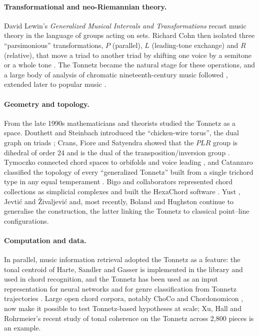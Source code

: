 \paragraph{Transformational and neo-Riemannian theory.} David Lewin's \emph{Generalized Musical Intervals and
Transformations} \citep{lewin1987} recast music theory in the language of groups acting on sets. Richard Cohn
then isolated three ``parsimonious'' transformations, $P$ (parallel), $L$ (leading-tone exchange) and $R$
(relative), that move a triad to another triad by shifting one voice by a semitone or a whole tone
\citep{cohn1996,cohn1997,cohn1998}. The Tonnetz became the natural stage for these operations, and a large body of
analysis of chromatic nineteenth-century music followed \citep{cohn2012}, extended later to popular music
\citep{capuzzo2004}.

\paragraph{Geometry and topology.} From the late 1990s mathematicians and theorists studied the Tonnetz as a
space. Douthett and Steinbach introduced the ``chicken-wire torus'', the dual graph on triads
\citep{douthett1998}; Crans, Fiore and Satyendra showed that the $PLR$ group is dihedral of order 24 and is the
dual of the transposition/inversion group \citep{crans2009}. Tymoczko connected chord spaces to orbifolds and
voice leading \citep{callender2008,tymoczko2011,tymoczko2012}, and Catanzaro classified the topology of every
``generalized Tonnetz'' built from a single trichord type in any equal temperament \citep{catanzaro2011}. Bigo and
collaborators represented chord collections as simplicial complexes and built the HexaChord software
\citep{bigo2013,bigo2016}. Yust \citep{yust2020}, Jevti\'c and \v{Z}ivaljevi\'c \citep{jevtic2021} and, most
recently, Boland and Hughston \citep{boland2025,boland2026} continue to generalise the construction, the latter
linking the Tonnetz to classical point--line configurations.

\paragraph{Computation and data.} In parallel, music information retrieval adopted the Tonnetz as a feature:
the tonal centroid of Harte, Sandler and Gasser \citep{harte2006} is implemented in the  library
\citep{mcfee2015} and used in chord recognition, and the Tonnetz has been used as an input representation for
neural networks \citep{chuan2018} and for genre classification from Tonnetz trajectories \citep{karystinaios2020}.
Large open chord corpora, notably ChoCo \citep{deberardinis2023} and Chordonomicon \citep{kantarelis2024}, now
make it possible to test Tonnetz-based hypotheses at scale; Xu, Hall and Rohrmeier's recent study of tonal
coherence on the Tonnetz across 2,800 pieces \citep{xu2026} is an example.

